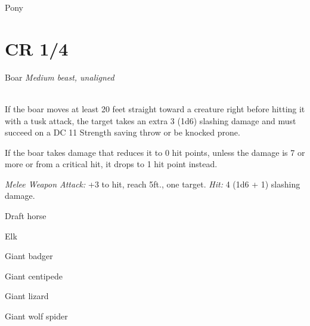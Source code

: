 \documentclass[10pt,twoside,twocolumn,openany]{book}
\begin{document}
Pony
\newpage
\section{CR 1/4}

\begin{monsterboxnobg}{Boar}
	\textit{Medium beast, unaligned}\\
	\hline
	\basics[
		armorclass	= 11,
		hitpoints 		= 11 (2d8 + 2),
		speed		= {40 ft.}
	]
	\hline
	\stats[
		STR	= \stat{13},
		DEX	= \stat{11},
		CON	= \stat{12},
		INT	= \stat{2},
		WIS	= \stat{9},
		CHA	= \stat{5}
	]
	\hline
	\details[
		skills			= {},
		senses 		= {passive Perception 9},
		languages		= {-},
		challenge 		= 1/4
	]
	\hline \\[1mm]
	\begin{monsteraction}[Charge]
		If the boar moves at least 20 feet straight toward a creature right before hitting it with a tusk attack, the target takes an extra 3 (1d6) slashing damage and must succeed on a DC 11 Strength saving throw or be knocked prone.
	\end{monsteraction}
	
	\begin{monsteraction}
		If the boar takes damage that reduces it to 0 hit points, unless the damage is 7 or more or from a critical hit, it drops to 1 hit point instead.
	\end{monsteraction}
	\begin{monsteraction}[Tusk]
		\textit{Melee Weapon Attack:} +3 to hit, reach 5ft., one target. \textit{Hit:} 4 (1d6 + 1) slashing damage.
	\end{monsteraction}
\end{monsterboxnobg}

Draft horse

Elk

Giant badger

Giant centipede

Giant lizard

Giant wolf spider
\end{document}
